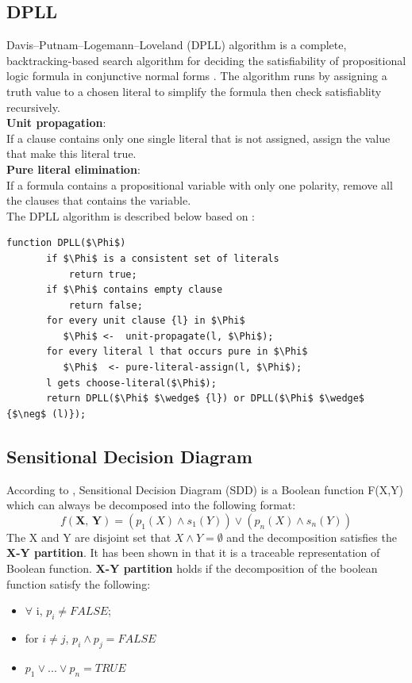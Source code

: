     \subsection{DPLL}
    Davis–Putnam–Logemann–Loveland (DPLL) algorithm is a complete, backtracking-based search algorithm for deciding the satisfiability of propositional logic formula in conjunctive normal forms \cite{Davis:1960:CPQ:321033.321034}. The algorithm runs by assigning a truth value to a chosen literal to simplify the formula then check satisfiablity recursively.\\ 
    \noindent \textbf{Unit propagation}:\\
    \noindent If a clause contains only one single literal that is not assigned, assign the value that make this literal true.\\
    \noindent \textbf{Pure literal elimination}:\\
    \noindent If a formula contains a propositional variable with only one polarity, remove all the clauses that contains the variable.\\
    
    \noindent The DPLL algorithm is described below based on \cite{DPLLbook}:
    \begin{lstlisting}[mathescape]
    function DPLL($\Phi$)
       if $\Phi$ is a consistent set of literals
           return true;
       if $\Phi$ contains empty clause
           return false;
       for every unit clause {l} in $\Phi$
          $\Phi$ <-  unit-propagate(l, $\Phi$);
       for every literal l that occurs pure in $\Phi$
          $\Phi$  <- pure-literal-assign(l, $\Phi$);
       l gets choose-literal($\Phi$);
       return DPLL($\Phi$ $\wedge$ {l}) or DPLL($\Phi$ $\wedge$ {$\neg$ (l)});
    \end{lstlisting}
    
   
    \subsection{Sensitional Decision Diagram}
    According to \cite{Darwiche:2011:SNC:2283516.2283536}, Sensitional Decision Diagram (SDD) is a Boolean function F(X,Y) which can always be decomposed into the following format:
    $$f(\textbf{X, Y}) = (p_{1}(X) \wedge s_{1}(Y)) \vee (p_{n}(X) \wedge s_{n}(Y)) $$
    The X and Y are disjoint set that $X \wedge Y = \emptyset$ and the decomposition satisfies the \textbf{X-Y partition}. It has been shown in \cite{Darwiche:2011:SNC:2283516.2283536} that it is a traceable representation of Boolean function.
    \textbf{X-Y partition} holds if the decomposition of the boolean function satisfy the following:
    \begin{itemize}
        \item  $\forall$ i, $p_{i} \neq FALSE$;
        \item for $i \neq j$, $p_{i} \wedge p_{j} = FALSE$
        \item $p_{1} \vee ... \vee p_{n} = TRUE$
    \end{itemize}
    
